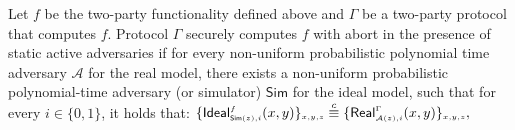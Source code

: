 %
%
%
% 
% 
% 
 \vs
\begin{definition}\label{def::MPC-active-adv}
Let $f$ be the two-party functionality defined above and $\Gamma$ be a two-party protocol that computes $f$.   Protocol $\Gamma$ securely computes $f$ with abort in the presence of static active adversaries if for every non-uniform probabilistic polynomial time adversary $\mathcal{A}$ for the real model, there exists a non-uniform probabilistic polynomial-time adversary (or simulator) $\mathsf{Sim}$ for the ideal model, such that for every $i\in \{0,1\}$, it holds that: 
%
$
\{\mathsf {Ideal}^{\scriptscriptstyle f}_{\scriptscriptstyle \mathsf{Sim}(z), i}(x,y)\}_{\scriptscriptstyle x,y,z}\stackrel{c}{\equiv} \{\mathsf{Real}_{\scriptscriptstyle \mathcal{A}(z), i}^{\scriptscriptstyle \Gamma}(x,y) \}_{\scriptscriptstyle x,y,z},
$
%
\end{definition}
